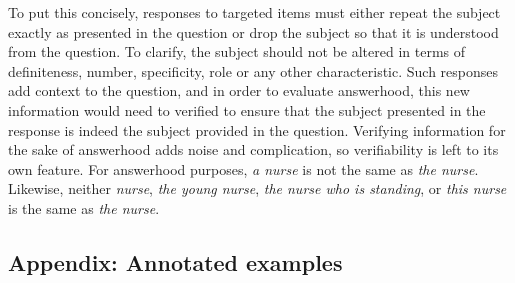 \documentclass[12pt,notitlepage]{article}
\begin{document}
To put this concisely, responses to targeted items must either repeat the subject exactly as presented in the question or drop the subject so that it is understood from the question. To clarify, the subject should not be altered in terms of definiteness, number, specificity, role or any other characteristic. Such responses add context to the question, and in order to evaluate answerhood, this new information would need to verified to ensure that the subject presented in the response is indeed the subject provided in the question. Verifying information for the sake of answerhood adds noise and complication, so verifiability is left to its own feature. For answerhood purposes, \textit{a nurse} is not the same as \textit{the nurse}. Likewise, neither \textit{nurse}, \textit{the young nurse}, \textit{the nurse who is standing}, or \textit{this nurse} is the same as \textit{the nurse}. 

\clearpage

\subsection{Appendix: Annotated examples}
\end{document}
